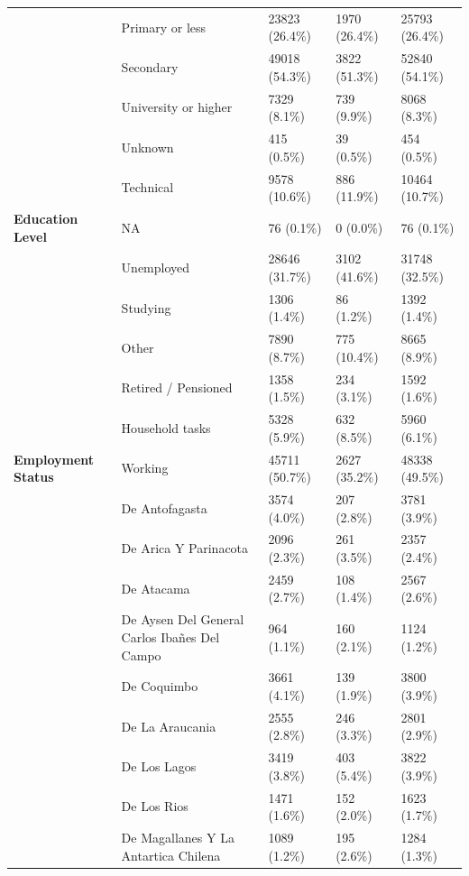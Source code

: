 \documentclass[
  spanish,
  10pt,
]{article}
\begin{document}
\begin{table}[H]
{\begin{tabular}[t]{>{}lllll}
\cmidrule{1-5}
 & Primary or less & 23823 (26.4\%) & 1970 (26.4\%) & 25793 (26.4\%)\\
\cmidrule{2-5}
 & Secondary & 49018 (54.3\%) & 3822 (51.3\%) & 52840 (54.1\%)\\
\cmidrule{2-5}
 & University or higher & 7329 (8.1\%) & 739 (9.9\%) & 8068 (8.3\%)\\
\cmidrule{2-5}
 & Unknown & 415 (0.5\%) & 39 (0.5\%) & 454 (0.5\%)\\
\cmidrule{2-5}
 & Technical & 9578 (10.6\%) & 886 (11.9\%) & 10464 (10.7\%)\\
\cmidrule{2-5}
\multirow[t]{-6}{*}{\raggedright\arraybackslash \textbf{Education Level}} & NA & 76 (0.1\%) & 0 (0.0\%) & 76 (0.1\%)\\
\cmidrule{1-5}
 & Unemployed & 28646 (31.7\%) & 3102 (41.6\%) & 31748 (32.5\%)\\
\cmidrule{2-5}
 & Studying & 1306 (1.4\%) & 86 (1.2\%) & 1392 (1.4\%)\\
\cmidrule{2-5}
 & Other & 7890 (8.7\%) & 775 (10.4\%) & 8665 (8.9\%)\\
\cmidrule{2-5}
 & Retired / Pensioned & 1358 (1.5\%) & 234 (3.1\%) & 1592 (1.6\%)\\
\cmidrule{2-5}
 & Household tasks & 5328 (5.9\%) & 632 (8.5\%) & 5960 (6.1\%)\\
\cmidrule{2-5}
\multirow[t]{-6}{*}{\raggedright\arraybackslash \textbf{Employment Status}} & Working & 45711 (50.7\%) & 2627 (35.2\%) & 48338 (49.5\%)\\
\cmidrule{1-5}
 & De Antofagasta & 3574 (4.0\%) & 207 (2.8\%) & 3781 (3.9\%)\\
\cmidrule{2-5}
 & De Arica Y Parinacota & 2096 (2.3\%) & 261 (3.5\%) & 2357 (2.4\%)\\
\cmidrule{2-5}
 & De Atacama & 2459 (2.7\%) & 108 (1.4\%) & 2567 (2.6\%)\\
\cmidrule{2-5}
 & De Aysen Del General Carlos Ibañes Del Campo & 964 (1.1\%) & 160 (2.1\%) & 1124 (1.2\%)\\
\cmidrule{2-5}
 & De Coquimbo & 3661 (4.1\%) & 139 (1.9\%) & 3800 (3.9\%)\\
\cmidrule{2-5}
 & De La Araucania & 2555 (2.8\%) & 246 (3.3\%) & 2801 (2.9\%)\\
\cmidrule{2-5}
 & De Los Lagos & 3419 (3.8\%) & 403 (5.4\%) & 3822 (3.9\%)\\
\cmidrule{2-5}
 & De Los Rios & 1471 (1.6\%) & 152 (2.0\%) & 1623 (1.7\%)\\
\cmidrule{2-5}
 & De Magallanes Y La Antartica Chilena & 1089 (1.2\%) & 195 (2.6\%) & 1284 (1.3\%)\\

\end{tabular}}
\end{table}
\end{document}
